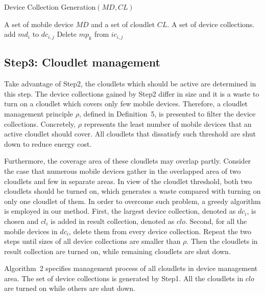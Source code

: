 \documentclass{llncs}
\begin{document}
\begin{algorithm}
\caption{Device Collection Generation$(MD, CL)$}
\begin{algorithmic}[1]
    \REQUIRE A set of mobile device $MD$ and a set of cloudlet $CL$.
    \ENSURE A set of device collections.
                \STATE add $md_i$ to $dc_{i,j}$
            \ENDIF
        \ENDFOR
    \ENDFOR
                    \STATE Delete $mp_k$ from $ic_{i,j}$
                \ENDIF
            \ENDFOR
        \ENDFOR
    \ENDFOR
\end{algorithmic}
\end{algorithm}
%
\subsection{Step3: Cloudlet management}
%
Take advantage of Step2, the cloudlets which should be active are determined in this step. The device collections gained by Step2 differ in size and it is a waste to turn on a cloudlet which covers only few mobile devices. Therefore, a cloudlet management principle $\rho$, defined in Definition~5, is presented to filter the device collections. Concretely, $\rho$ represents the least number of mobile devices that an active cloudlet should cover. All cloudlets that dissatisfy such threshold are shut down to reduce energy cost.

Furthermore, the coverage area of these cloudlets may overlap partly. Consider the case that numerous mobile devices gather in the overlapped area of two cloudlets and few in separate areas. In view of the cloudlet threshold, both two cloudlets should be turned on, which generates a waste compared with turning on only one cloudlet of them. In order to overcome such problem, a greedy algorithm is employed in our method. First, the largest device collection, denoted as $dc_i$, is chosen and $cl_i$ is added in result collection, denoted as $clo$. Second, for all the mobile devices in $dc_i$, delete them from every device collection. Repeat the two steps until sizes of all device collections are smaller than $\rho$. Then the cloudlets in result collection are turned on, while remaining cloudlets are shut down.

Algorithm~2 specifies management process of all cloudlets in device management area. The set of device collections is generated by Step1. All the cloudlets in $clo$ are turned on while others are shut down.
\end{document}
